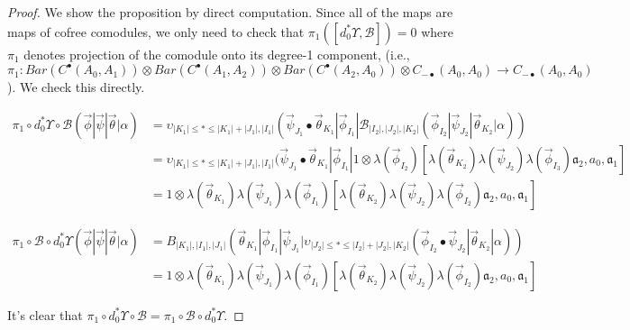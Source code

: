 \begin{proof}
We show the proposition by direct computation. Since all of the maps are maps of cofree comodules, we only need to check that $\pi_1([d_0^* \Upsilon, \mathcal{B}]) = 0$ where $\pi_1$ denotes projection of the comodule onto its degree-1 component, (i.e., $\pi_1: Bar(C^\bullet(A_0, A_1)) \otimes Bar(C^\bullet(A_1, A_2)) \otimes Bar(C^\bullet(A_2, A_0)) \otimes C_{-\bullet}(A_0, A_0) \rightarrow C_{-\bullet}(A_0, A_0)$). We check this directly.

\begin{equation*}
\begin{aligned}
\pi_1 \circ d_0^* \Upsilon \circ \mathcal{B} (\vec{\phi} | \vec{\psi} | \vec{\theta} | \alpha ) 
&= \upsilon_{|K_1| \leq * \leq |K_1|+|J_1|, |I_1|} (
   \vec{\psi}_{J_1} \bullet \vec{\theta}_{K_1} | 
   \vec{\phi}_{I_1} | 
   \mathcal{B}_{|I_2|, |J_2|, |K_2|} (\vec{\phi}_{I_2} | \vec{\psi}_{J_2} | \vec{\theta}_{K_2} | \alpha)) \\
&= \upsilon_{|K_1| \leq * \leq |K_1|+|J_1|, |I_1|} (
   \vec{\psi}_{J_1} \bullet \vec{\theta}_{K_1} | 
   \vec{\phi}_{I_1} |
   1 \otimes \lambda(\vec{\phi}_{I_2})[
     \lambda(\vec{\theta}_{K_2}) \lambda(\vec{\psi}_{J_2}) \lambda(\vec{\phi}_{I_3})
     \mathfrak{a}_2, a_0, \mathfrak{a}_1] \\
&= 1 \otimes \lambda(\vec{\theta}_{K_1}) \lambda(\vec{\psi}_{J_1}) \lambda(\vec{\phi}_{I_1})[
     \lambda(\vec{\theta}_{K_2}) \lambda(\vec{\psi}_{J_2}) \lambda(\vec{\phi}_{I_2})
     \mathfrak{a}_2, a_0, \mathfrak{a}_1]    
\end{aligned}
\end{equation*}

\begin{align*}
\pi_1 \circ \mathcal{B} \circ d_0^* \Upsilon (\vec{\phi} | \vec{\psi} | \vec{\theta} | \alpha ) 
&= B_{|K_1|, |I_1|, |J_1|} 
   (\vec{\theta}_{K_1} | \vec{\phi}_{I_1} | \vec{\psi}_{J_1} | 
   \upsilon_{|J_2| \leq * \leq |I_2|+|J_2|, |K_2|} 
   (\vec{\phi}_{I_2} \bullet \vec{\psi}_{J_2} | \vec{\theta}_{K_2} | \alpha)) \\
&= 1 \otimes \lambda(\vec{\theta}_{K_1}) \lambda(\vec{\psi}_{J_1}) \lambda(\vec{\phi}_{I_1})[
     \lambda(\vec{\theta}_{K_2}) \lambda(\vec{\psi}_{J_2}) \lambda(\vec{\phi}_{I_2})
     \mathfrak{a}_2, a_0, \mathfrak{a}_1]  
\end{align*}

It's clear that $\pi_1 \circ d_0^* \Upsilon \circ \mathcal{B} =  \pi_1 \circ \mathcal{B} \circ d_0^* \Upsilon$.
\end{proof}